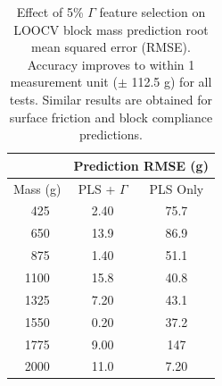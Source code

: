 \begin{table}[h]
\centering
\begin{tabular}{c|c|c|}
\cline{2-3}
\multicolumn{1}{l|}{}                  & \multicolumn{2}{c|}{Prediction RMSE (g)} \\ \hline
\multicolumn{1}{|c|}{Mass (g)} & PLS + $\Gamma$    & PLS Only   \\ \hline
\multicolumn{1}{|c|}{~425}           & 2.40              & 75.7         \\
\multicolumn{1}{|c|}{~650}           & 13.9              & 86.9         \\
\multicolumn{1}{|c|}{~875}           & 1.40              & 51.1         \\
\multicolumn{1}{|c|}{1100}           & 15.8              & 40.8         \\
\multicolumn{1}{|c|}{1325}           & 7.20              & 43.1         \\
\multicolumn{1}{|c|}{1550}           & 0.20              & 37.2         \\
\multicolumn{1}{|c|}{1775}           & 9.00              & 147         \\
\multicolumn{1}{|c|}{2000}           & 11.0              & 7.20         \\ \hline
\end{tabular}
\caption{Effect of 5\% $\Gamma$ feature selection on LOOCV block mass prediction root mean squared error (RMSE). Accuracy improves to within 1 measurement unit ($\pm$ 112.5 g) for all tests. Similar results are obtained for surface friction and block compliance predictions.}
\label{fig:TVR-perf}
\end{table}


